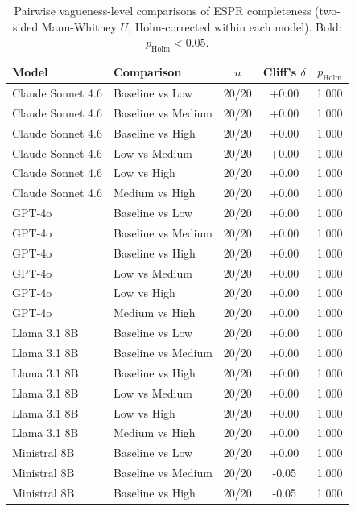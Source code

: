 \begin{table}[t]
  \centering
  \caption{Pairwise vagueness-level comparisons of ESPR completeness (two-sided Mann-Whitney $U$, Holm-corrected within each model). Bold: $p_{\text{Holm}} < 0.05$.}
  \label{tab:espr_significance}
  \begin{tabular}{llccc}
    \toprule
    Model & Comparison & $n$ & Cliff's $\delta$ & $p_{\text{Holm}}$ \\
    \midrule
    Claude Sonnet 4.6 & Baseline vs Low & 20/20 & +0.00 & 1.000 \\
    Claude Sonnet 4.6 & Baseline vs Medium & 20/20 & +0.00 & 1.000 \\
    Claude Sonnet 4.6 & Baseline vs High & 20/20 & +0.00 & 1.000 \\
    Claude Sonnet 4.6 & Low vs Medium & 20/20 & +0.00 & 1.000 \\
    Claude Sonnet 4.6 & Low vs High & 20/20 & +0.00 & 1.000 \\
    Claude Sonnet 4.6 & Medium vs High & 20/20 & +0.00 & 1.000 \\
    GPT-4o & Baseline vs Low & 20/20 & +0.00 & 1.000 \\
    GPT-4o & Baseline vs Medium & 20/20 & +0.00 & 1.000 \\
    GPT-4o & Baseline vs High & 20/20 & +0.00 & 1.000 \\
    GPT-4o & Low vs Medium & 20/20 & +0.00 & 1.000 \\
    GPT-4o & Low vs High & 20/20 & +0.00 & 1.000 \\
    GPT-4o & Medium vs High & 20/20 & +0.00 & 1.000 \\
    Llama 3.1 8B & Baseline vs Low & 20/20 & +0.00 & 1.000 \\
    Llama 3.1 8B & Baseline vs Medium & 20/20 & +0.00 & 1.000 \\
    Llama 3.1 8B & Baseline vs High & 20/20 & +0.00 & 1.000 \\
    Llama 3.1 8B & Low vs Medium & 20/20 & +0.00 & 1.000 \\
    Llama 3.1 8B & Low vs High & 20/20 & +0.00 & 1.000 \\
    Llama 3.1 8B & Medium vs High & 20/20 & +0.00 & 1.000 \\
    Ministral 8B & Baseline vs Low & 20/20 & +0.00 & 1.000 \\
    Ministral 8B & Baseline vs Medium & 20/20 & -0.05 & 1.000 \\
    Ministral 8B & Baseline vs High & 20/20 & -0.05 & 1.000 \\

\end{tabular}
\end{table}
